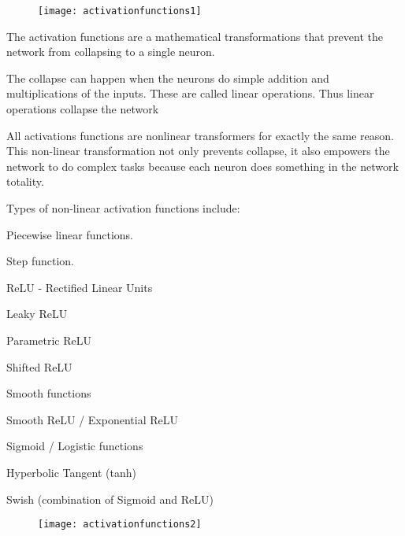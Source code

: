  	\begin{figure}[h]
		\centering
		\texttt{[image: activationfunctions1]}
		\caption{}
		\label{fig:activationfunctions1}
	\end{figure}

	\begin{bulletedlist}
		\item The activation functions are a mathematical transformations that prevent the network from collapsing to a single neuron.
		\item The collapse can happen when the neurons do simple addition and multiplications of the inputs. These are called linear operations. Thus linear operations collapse the network
		\item All activations functions are nonlinear transformers for exactly the same reason. This non-linear transformation not only prevents collapse, it also empowers the network to do complex tasks because each neuron does something in the network totality.

		\item Types of non-linear activation functions include:
		\begin{bulletedlist}
			\item Piecewise linear functions.
			\begin{bulletedlist}
				\item Step function.
				\item ReLU - Rectified Linear Units
				\item Leaky ReLU
				\item Parametric ReLU
				\item Shifted ReLU
			\end{bulletedlist}
			\item Smooth functions
			\begin{bulletedlist}
				\item Smooth ReLU / Exponential ReLU
				\item Sigmoid / Logistic functions
				\item Hyperbolic Tangent (tanh)
				\item Swish (combination of Sigmoid and ReLU)
			\end{bulletedlist}
		\end{bulletedlist}
	\end{bulletedlist}

 	\begin{figure}[h]
		\centering
		\texttt{[image: activationfunctions2]}
		\caption{}
		\label{fig:activationfunctions2}
	\end{figure}


